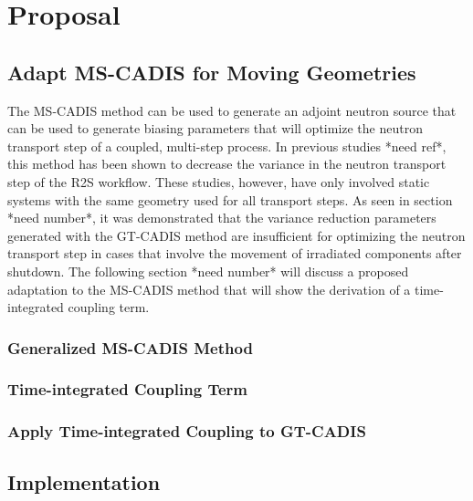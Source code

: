 \chapter{Proposal}\label{ch:proposal}

\section{Adapt MS-CADIS for Moving Geometries}\label{sec:adapt}
The MS-CADIS method can be used to generate an adjoint neutron source 
that can be used to generate biasing parameters that will optimize the neutron transport step of a coupled,
multi-step process. In previous studies *need ref*, this method has been shown to decrease
the variance in the neutron transport step of the R2S workflow.  These studies,
however, have only involved static systems with the same geometry used for all
transport steps.  
As seen in section *need number*, it was demonstrated that the variance
reduction parameters generated with the GT-CADIS method are insufficient for
optimizing the neutron transport step in cases that involve the movement 
of irradiated components after shutdown.  
The following section *need number* will discuss a proposed adaptation to the
MS-CADIS method that will show the derivation of a time-integrated coupling
term.

\subsection{Generalized MS-CADIS Method}

\subsection{Time-integrated Coupling Term}

\subsection{Apply Time-integrated Coupling to GT-CADIS}

\section{Implementation}\label{sec:implementation}

